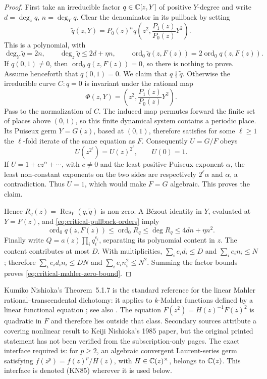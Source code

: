 \begin{proof}
First take an irreducible factor \(q\in\mathbb{C}[z,Y]\) of positive
\(Y\)-degree and write \(d=\deg_zq\), \(n=\deg_Yq\).  Clear the denominator
in its pullback by setting
\[
 \widetilde q(z,Y)=P_0(z)^n
 q\!\left(z^2,\frac{P_1(z)}{P_0(z)}Y^2\right).
\]
This is a polynomial, with
\begin{equation}\label{eq:critical-pullback-orders}
 \deg_Y\widetilde q=2n,\qquad
 \deg_z\widetilde q\le2d+\eta n,\qquad
 \operatorname{ord}_0\widetilde q(z,F(z))
 =2\operatorname{ord}_0q(z,F(z)).
\end{equation}
If \(q(0,1)\ne0\), then \(\operatorname{ord}_0q(z,F(z))=0\), so there is
nothing to prove.  Assume henceforth that \(q(0,1)=0\).
We claim that \(q\nmid\widetilde q\).  Otherwise the irreducible curve
\(C:q=0\) is invariant under the rational map
\[
 \Phi(z,Y)=\left(z^2,\frac{P_1(z)}{P_0(z)}Y^2\right).
\]
Pass to the normalization of \(C\).  The induced map permutes forward the
finite set of places above \((0,1)\), so this finite dynamical system contains
a periodic place.  Its Puiseux germ \(Y=G(z)\), based at \((0,1)\), therefore
satisfies for some \(\ell\ge1\) the \(\ell\)-fold iterate of the same equation
as \(F\).  Consequently \(U=G/F\) obeys
\[
 U(z^{2^\ell})=U(z)^{2^\ell},\qquad U(0)=1.
\]
If \(U=1+cz^\alpha+\cdots\), with \(c\ne0\) and the least positive Puiseux
exponent \(\alpha\), the least non-constant exponents on the two sides are
respectively \(2^\ell\alpha\) and \(\alpha\), a contradiction.  Thus
\(U=1\), which would make \(F=G\) algebraic.  This proves the claim.

Hence \(R_q(z)=\operatorname{Res}_Y(q,\widetilde q)\) is non-zero.  A
B\'ezout identity in \(Y\), evaluated at \(Y=F(z)\), and
\eqref{eq:critical-pullback-orders} imply
\[
 \operatorname{ord}_0q(z,F(z))
 \le\operatorname{ord}_0R_q
 \le\deg R_q
 \le4dn+\eta n^2.
\]
Finally write \(Q=a(z)\prod_iq_i^{e_i}\), separating its polynomial content
in \(z\).  The content contributes at most \(D\).  With multiplicities,
\(\sum_i e_id_i\le D\) and \(\sum_i e_in_i\le N\); therefore
\(\sum_i e_id_in_i\le DN\) and
\(\sum_i e_in_i^2\le N^2\).  Summing the factor bounds proves
\eqref{eq:critical-mahler-zero-bound}.
\end{proof}

Kumiko Nishioka's Theorem~5.1.7 is the standard reference for the linear
Mahler rational--transcendental dichotomy: it applies to \(k\)-Mahler
functions defined by a linear functional equation
\cite[Theorem~5.1.7]{Nishioka1996MahlerFunctions}; see also
\cite[Corollary~8]{BellCoonsRowland2013MahlerDichotomy}.  The equation
\(F(z^2)=H(z)^{-1}F(z)^2\) is quadratic in \(F\) and therefore lies outside
that class.  Secondary sources attribute a covering nonlinear result to
Keiji Nishioka's 1985 paper, but the original printed statement has not been
verified from the subscription-only pages.  The exact interface required is:
for \(p\ge2\), an algebraic convergent Laurent-series germ satisfying
\(f(z^p)=f(z)^p/H(z)\), with \(H\in\mathbb{C}(z)^\times\), belongs to
\(\mathbb{C}(z)\).  This interface is denoted \textup{(KN85)} wherever it is used
below.

